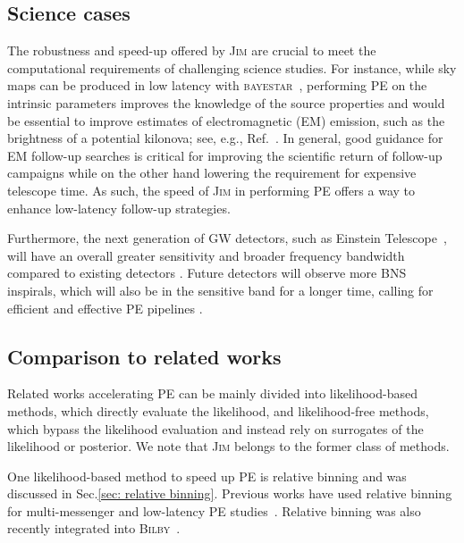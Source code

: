 \documentclass[prd,twocolumn,a4paper,floatfix,nofootinbib,preprintnumbers,superscriptaddress]{revtex4-1}
\begin{document}
\subsection{Science cases}

The robustness and speed-up offered by \textsc{Jim} are crucial to meet the computational requirements of challenging science studies. For instance, while sky maps can be produced in low latency with \textsc{bayestar}~\cite{Singer:2015ema}, performing \ac{PE} on the intrinsic parameters improves the knowledge of the source properties and would be essential to improve estimates of electromagnetic (EM) emission, such as the brightness of a potential kilonova; see, e.g., Ref.~\cite{Stachie:2021noh}. In general, good guidance for EM follow-up searches is critical for improving the scientific return of follow-up campaigns while on the other hand lowering the requirement for expensive telescope time. As such, the speed of \textsc{Jim} in performing \ac{PE} offers a way to enhance low-latency follow-up strategies. 

Furthermore, the next generation of \ac{GW} detectors, such as Einstein Telescope~\cite{Punturo:2010zza}, will have an overall greater sensitivity and broader frequency bandwidth compared to existing detectors \cite{Maggiore:2019uih, Evans:2023euw, Branchesi:2023mws}. Future detectors will observe more \ac{BNS} inspirals, which will also be in the sensitive band for a longer time, calling for efficient and effective \ac{PE} pipelines
\cite{Samajdar:2021egv,Pizzati:2021apa}. 

\subsection{Comparison to related works}\label{sec: comparison to related works}
Related works accelerating \ac{PE} can be mainly divided into likelihood-based methods, which directly evaluate the likelihood, and likelihood-free methods, which bypass the likelihood evaluation and instead rely on surrogates of the likelihood or posterior. We note that \textsc{Jim} belongs to the former class of methods.

One likelihood-based method to speed up \ac{PE} is relative binning and was discussed in Sec.\ref{sec: relative binning}. Previous works have used relative binning for multi-messenger and low-latency \ac{PE} studies~\cite{Finstad:2020sok, Raaijmakers:2021slr}. Relative binning was also recently integrated into \textsc{Bilby}~\cite{Krishna:2023bug}.
 
\end{document}
